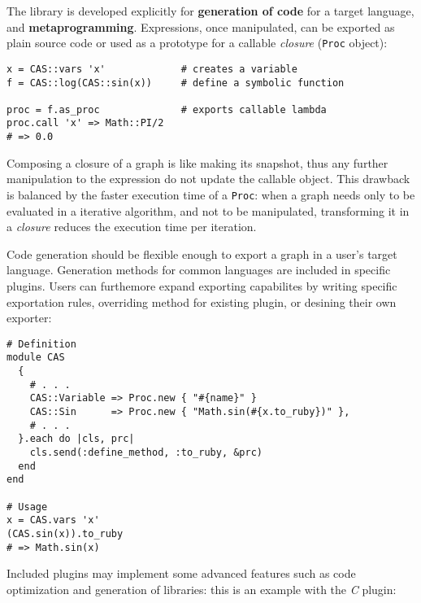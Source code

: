 The library is developed explicitly for \textbf{generation of code} for a target language, and \textbf{meta\-programming}. Expressions, once manipulated, can be exported as plain source code or used as a prototype for a callable \emph{closure} (\texttt{Proc} object):
\begin{lstlisting}[caption={Graph evaluation example},label={code:example-proc}]
x = CAS::vars 'x'             # creates a variable
f = CAS::log(CAS::sin(x))     # define a symbolic function

proc = f.as_proc              # exports callable lambda
proc.call 'x' => Math::PI/2
# => 0.0
\end{lstlisting}
Composing a closure of a graph is like making its snapshot, thus any further manipulation to the expression do not update the callable object. This drawback is balanced by the faster execution time of a \texttt{Proc}: when a graph needs only to be evaluated in a iterative algorithm, and not to be manipulated, transforming it in a \emph{closure} reduces the execution time per iteration.

Code generation should be flexible enough to export a graph in a user's target language. Generation methods for common languages are included in specific plugins. Users can furthemore expand exporting capabilites by writing specific exportation rules,  overriding method for existing plugin, or desining their own exporter:
\begin{lstlisting}[caption={Example of Ruby exportation plugin},label={code:example-exporting}]
# Definition
module CAS
  {
    # . . .
    CAS::Variable => Proc.new { "#{name}" }
    CAS::Sin      => Proc.new { "Math.sin(#{x.to_ruby})" },
    # . . .
  }.each do |cls, prc|
    cls.send(:define_method, :to_ruby, &prc)
  end
end

# Usage
x = CAS.vars 'x'
(CAS.sin(x)).to_ruby
# => Math.sin(x)
\end{lstlisting}

Included plugins may implement some advanced features such as code optimization and generation of libraries: this is an example with the \emph{C} plugin:

